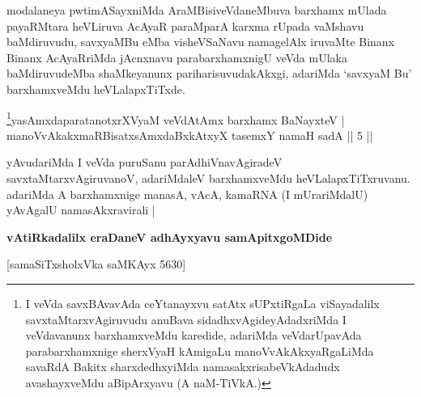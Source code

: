 \begin{artha}
modalaneya pwtimASayxniMda AraMBisiveVdaneMbuva barxhamx mUlada
 payaRMtara heVLiruva AcAyaR paraMparA karxma rUpada vaMshavu
baMdiruvudu, savxyaMBu eMba visheVSaNavu namagelAlx iruvaMte Binanx
Binanx AcAyaRriMda jAcnxnavu parabarxhamxnigU veVda mUlaka
baMdiruvudeMba shaMkeyanunx pariharisuvudakAkxgi, adariMda `savxyaM Bu'
barxhamxveMdu heVLalapxTiTxde.
\end{artha}

\begin{shl}\footnote{I veVda savxBAvavAda ceYtanayxvu satAtx sUPxtiRgaLa viSayadalilx savxtaMtarxvAgiruvudu anuBava sidadhxvAgideyAdadxriMda I veVdavanunx barxhamxveMdu karedide, adariMda veVdarUpavAda parabarxhamxnige sherxVyaH kAmigaLu manoVvAkAkxyaRgaLiMda savaRdA Bakitx sharxdedhxyiMda namasakxrisabeVkAdadudx avashayxveMdu aBipArxyavu (A naM-TiVkA.)}yasAmxdaparatanotxrXV\s yaM veVdAtAmx barxhamx BaNayxteV |\\
manoVvAkakxmaRBisatxsAmxdaBxkAtxyX tasemxY namaH sadA \hfill || 5 ||
\end{shl}

\begin{artha}
yAvudariMda I veVda puruSanu parAdhiVnavAgiradeV
savxtaMtarxvAgiruvanoV, adariMdaleV barxhamxveMdu
heVLalapxTiTxruvanu. adariMda A barxhamxnige manasA, vAcA, kamaRNA
(I mUrariMdalU) yAvAgalU namasAkxravirali |
\end{artha}

\begin{center}
\textbf{vAtiRkadalilx eraDaneV adhAyxyavu samApitxgoMDide }

\medskip

 [samaSiTxsholxVka saMKAyx 5630]
\end{center}
